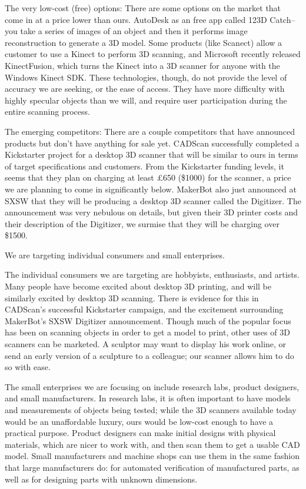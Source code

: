\documentclass{article}
\begin{document}
The very low-cost (free) options: There are some options on the market that come
in at a price lower than ours. AutoDesk as an free app called 123D Catch--you
take a series of images of an object and then it performs image reconstruction
to generate a 3D model. Some products (like Scanect) allow a customer to use a
Kinect to perform 3D scanning, and Microsoft recently released KinectFusion,
which turns the Kinect into a 3D scanner for anyone with the Windows Kinect SDK.
These technologies, though, do not provide the level of accuracy we are seeking,
or the ease of access. They have more difficulty with highly specular objects
than we will, and require user participation during the entire scanning process.

The emerging competitors: There are a couple competitors that have announced
products but don't have anything for sale yet. CADScan successfully completed a
Kickstarter project for a desktop 3D scanner that will be similar to ours in
terms of target specifications and customers. From the Kickstarter funding
levels, it seems that they plan on charging at least £650 (\$1000) for the
scanner, a price we are planning to come in significantly below. MakerBot also
just announced at SXSW that they will be producing a desktop 3D scanner called
the Digitizer. The announcement was very nebulous on details, but given their 3D
printer costs and their description of the Digitizer, we surmise that they will
be charging over \$1500.

We are targeting individual consumers and small enterprises.

The individual consumers we are targeting are hobbyists, enthusiasts, and
artists. Many people have become excited about desktop 3D printing, and will be
similarly excited by desktop 3D scanning. There is evidence for this in
CADScan's successful Kickstarter campaign, and the excitement surrounding
MakerBot's SXSW Digitizer announcement. Though much of the popular focus has
been on scanning objects in order to get a model to print, other uses of 3D
scanners can be marketed. A sculptor may want to display his work online, or
send an early version of a sculpture to a colleague; our scanner allows him to
do so with ease.


The small enterprises we are focusing on include research labs, product
designers, and small manufacturers. In research labs, it is often important to
have models and measurements of objects being tested; while the 3D scanners
available today would be an unaffordable luxury, ours would be low-cost enough
to have a practical purpose. Product designers can make initial designs with
physical materials, which are nicer to work with, and then scan them to get a
usable CAD model. Small manufacturers and machine shops can use them in the same
fashion that large manufacturers do: for automated verification of manufactured
parts, as well as for designing parts with unknown dimensions.
\end{document}
